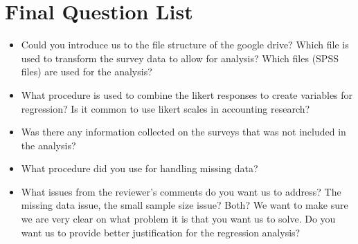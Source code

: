 \section{Final Question List}
\begin{itemize}
    \item Could you introduce us to the file structure of the google drive? Which file is used to transform the survey data to allow for analysis? Which files (SPSS files) are used for the analysis?
    \item What procedure is used to combine the likert responses to create variables for regression? Is it common to use likert scales in accounting research?
    \item Was there any information collected on the surveys that was not included in the analysis?
    \item What procedure did you use for handling missing data?
    \item What issues from the reviewer's comments do you want us to address? The missing data issue, the small sample size issue? Both? We want to make sure we are very clear on what problem it is that you want us to solve. Do you want us to provide better justification for the regression analysis?
\end{itemize}